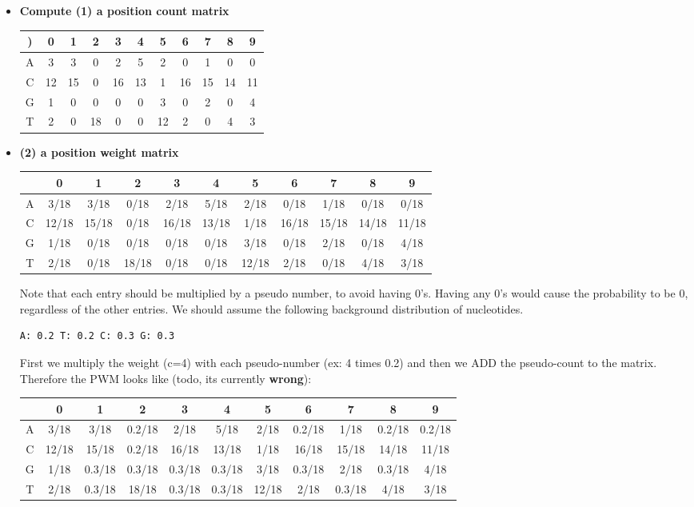 \documentclass[a4paper,10pt,titlepage]{article}
\begin{document}
\begin{itemize}
\item
\textbf{Compute (1) a position count matrix} 
\begin{table}[!h]
\begin{tabular}{c | c | c | c | c | c | c | c | c | c | c | })
  & 0  & 1  & 2  & 3  & 4  & 5  & 6  & 7  & 8  & 9 \\
  \hline
	A & 3  & 3  & 0  & 2  & 5  & 2  & 0  & 1  & 0  & 0 \\
	C & 12 & 15 & 0  & 16 & 13 & 1  & 16 & 15 & 14 & 11 \\
	G & 1  & 0  & 0  & 0  & 0  & 3  & 0  & 2  & 0  & 4 \\
	T & 2  & 0  & 18 & 0  & 0  & 12 & 2  & 0  & 4  & 3 \\
\end{tabular}
\end{table}
\item
\textbf{(2) a position weight matrix} 
\begin{table}[!h]
  \begin{tabular}{| c | c | c | c | c | c | c | c | c | c | c}
	  & 0 	  & 1     & 2     & 3  	  & 4  & 5  & 6  & 7  & 8  & 9 \\
	\hline
	A & 3/18  & 3/18  & 0/18  & 2/18  & 5/18  & 2/18  & 0/18  & 1/18  & 0/18  & 0/18 \\
	C & 12/18 & 15/18 & 0/18  & 16/18 & 13/18 & 1/18  & 16/18 & 15/18 & 14/18 & 11/18\\
	G & 1/18  & 0/18  & 0/18  & 0/18  & 0/18  & 3/18  & 0/18  & 2/18  & 0/18  & 4/18 \\
	T & 2/18  & 0/18  & 18/18 & 0/18  & 0/18  & 12/18 & 2/18  & 0/18  & 4/18  & 3/18 \\
  \end{tabular}
\end{table}
Note that each entry should be multiplied by a pseudo number, to avoid having 0's. Having any 0's would cause the probability to be 0, regardless of the other entries.
We should assume the following background distribution of nucleotides.
\begin{verbatim}
A: 0.2 T: 0.2 C: 0.3 G: 0.3
\end{verbatim}
First we multiply the weight (c=4) with each pseudo-number (ex: 4 times 0.2) and then we ADD the pseudo-count to the matrix. Therefore the PWM looks like (todo, its currently \textbf{wrong}):
\begin{table}[!h]
  \begin{tabular}{| c | c | c | c | c | c | c | c | c | c | c}
	  & 0  & 1  & 2  & 3  & 4  & 5  & 6  & 7  & 8  & 9 \\
	\hline
	A & 3/18  & 3/18  & 0.2/18  & 2/18  & 5/18  & 2/18  & 0.2/18  & 1/18  & 0.2/18  & 0.2/18 \\
	C & 12/18 & 15/18 & 0.2/18  & 16/18 & 13/18 & 1/18  & 16/18 & 15/18 & 14/18 & 11/18\\
	G & 1/18  & 0.3/18  & 0.3/18  & 0.3/18  & 0.3/18  & 3/18  & 0.3/18  & 2/18  & 0.3/18  & 4/18 \\
	T & 2/18  & 0.3/18  & 18/18 & 0.3/18  & 0.3/18  & 12/18 & 2/18  & 0.3/18  & 4/18  & 3/18 \\
	\end{tabular}
\end{table}


\end{itemize}
\end{document}
